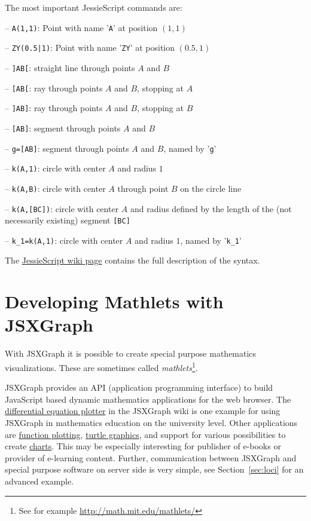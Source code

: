 \documentclass[12pt,a4paper]{article}%
\begin{document}
The most important JessieScript commands are:
\begin{description}
\item{-- \verb+A(1,1)+:} Point with name '\verb|A|' at position $(1,1)$
\item{-- \verb+ZY(0.5|1)+:} Point with name '\verb|ZY|' at position $(0.5,1)$
\item{-- \verb|]AB[|:} straight line through points $A$ and $B$
\item{-- \verb|[AB[|:} ray through points $A$ and $B$, stopping at $A$
\item{-- \verb|]AB]|:} ray through points $A$ and $B$, stopping at $B$
\item{-- \verb|[AB]|:} segment through points $A$ and $B$
\item{-- \verb|g=[AB]|:} segment through points $A$ and $B$, named by '\verb|g|'
\item{-- \verb|k(A,1)|:} circle with center $A$ and radius $1$
\item{-- \verb|k(A,B)|:} circle with center $A$ through point $B$ on the circle line
\item{-- \verb|k(A,[BC])|:} circle with center $A$ and radius defined by the length of the 
(not necessarily existing) segment \verb|[BC]|
\item{-- \verb|k_1=k(A,1)|:} circle with center $A$ and radius $1$, named by '\verb|k_1|' 
\end{description}
The \href{http://jsxgraph.uni-bayreuth.de/wiki/index.php/Geometric_constructions_with_JessieScript}{JessieScript wiki page} contains the full description of the syntax.


\section{Developing Mathlets with JSXGraph}
With JSXGraph it is possible to create special purpose mathematics visualizations.
These are sometimes called {\sl mathlets}\footnote{See for example
\href{http://math.mit.edu/mathlets/}{http://math.mit.edu/mathlets/}}.

JSXGraph provides an API (application programming interface) to build JavaScript based 
dynamic mathematics applications for the web browser. 
The \href{http://jsxgraph.uni-bayreuth.de/wiki/index.php/Differential_equations}{differential equation plotter}
in the JSXGraph wiki is one example for using JSXGraph in mathematics 
education on the university level. 
Other applications are 
\href{http://jsxgraph.uni-bayreuth.de/wiki/index.php/Even_simpler_function_plotter}{function plotting}, 
\href{http://jsxgraph.uni-bayreuth.de/wiki/index.php/Programming_turtle_graphics}{turtle graphics}, 
and support for various possibilities to create 
\href{http://jsxgraph.uni-bayreuth.de/wiki/index.php/Category:Charts}{charts}. 
This may be especially interesting for publisher of e-books or provider of e-learning 
content. 
Further, communication between JSXGraph and special purpose software on server side is very simple, see 
Section~\ref{sec:loci} for an advanced example.
\end{document}
